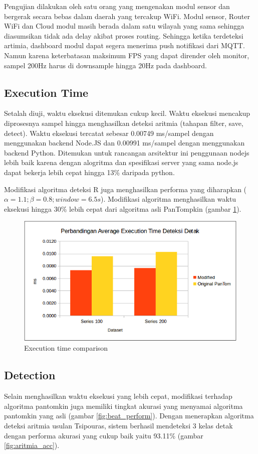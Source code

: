 \documentclass[]{indojc}
\begin{document}
Pengujian dilakukan oleh satu orang yang mengenakan modul sensor dan bergerak secara bebas dalam daerah yang tercakup WiFi. Modul sensor, Router WiFi dan Cloud modul masih berada dalam satu wilayah yang sama sehingga diasumsikan tidak ada delay akibat proses routing. Sehingga ketika terdeteksi artimia, dashboard modul dapat segera menerima push notifikasi dari MQTT. Namun karena keterbatasan maksimum FPS yang dapat dirender oleh monitor, sampel 200Hz harus di downsample hingga 20Hz pada dashboard.

\subsection{Execution Time}
Setalah diuji, waktu eksekusi ditemukan cukup kecil. Waktu eksekusi mencakup diprosesnya sampel hingga menghasilkan deteksi aritmia (tahapan filter, save, detect). Waktu eksekusi tercatat sebesar 0.00749 ms/sampel dengan menggunakan backend Node.JS dan 0.00991 ms/sampel dengan menggunakan backend Python. Ditemukan untuk rancangan arsitektur ini penggunaan nodejs lebih baik karena dengan alogritma dan spesifikasi server yang sama node.js dapat bekerja lebih cepat hingga 13\% daripada python.

Modifikasi algoritma deteksi R juga menghasilkan performa yang diharapkan ($\alpha = 1.1; \beta = 0.8; window = 6.5s$). Modifikasi algoritma menghasilkan waktu eksekusi hingga 30\% lebih cepat dari algoritma asli PanTompkin (gambar \ref{fig:exec_time}). 

\begin{figure}[htbp]
\centerline{\includegraphics[scale=0.41]{images/beat_exec.png}}
\caption{Execution time comparison}
\label{fig:exec_time}
\end{figure}

\subsection{Detection}
Selain menghasilkan waktu eksekusi yang lebih cepat, modifikasi terhadap algoritma pantomkin juga memiliki tingkat akurasi yang menyamai algoritma pantomkin yang asli (gambar \ref{fig:beat_perform}). Dengan menerapkan algoritma deteksi aritmia usulan Tsipouras, sistem berhasil mendeteksi 3 kelas detak dengan performa akurasi yang cukup baik yaitu 93.11\% (gambar \ref{fig:aritmia_acc}).
\end{document}
